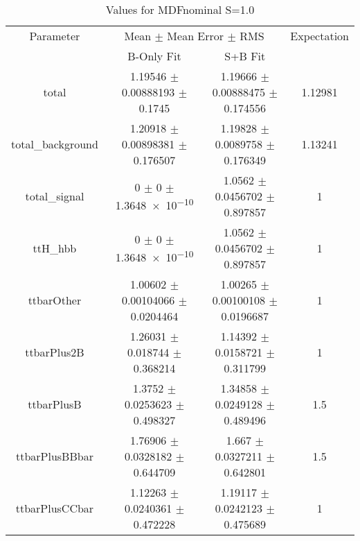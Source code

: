 \begin{table}
\centering
\caption{Values for MDFnominal S=1.0}
\begin{tabular}{cccc}
\toprule
Parameter & \multicolumn{2}{c}{Mean $\pm$ Mean Error $\pm$ RMS} & Expectation\\
 & B-Only Fit & S+B Fit & \\
\midrule
total & \num{1.19546} $\pm$ \num{0.00888193} $\pm$ \num{0.1745} & \num{1.19666} $\pm$ \num{0.00888475} $\pm$ \num{0.174556} & \num{1.12981}\\
total\_background & \num{1.20918} $\pm$ \num{0.00898381} $\pm$ \num{0.176507} & \num{1.19828} $\pm$ \num{0.0089758} $\pm$ \num{0.176349} & \num{1.13241}\\
total\_signal & \num{0} $\pm$ \num{0} $\pm$ \num{1.3648e-10} & \num{1.0562} $\pm$ \num{0.0456702} $\pm$ \num{0.897857} & \num{1}\\
ttH\_hbb & \num{0} $\pm$ \num{0} $\pm$ \num{1.3648e-10} & \num{1.0562} $\pm$ \num{0.0456702} $\pm$ \num{0.897857} & \num{1}\\
ttbarOther & \num{1.00602} $\pm$ \num{0.00104066} $\pm$ \num{0.0204464} & \num{1.00265} $\pm$ \num{0.00100108} $\pm$ \num{0.0196687} & \num{1}\\
ttbarPlus2B & \num{1.26031} $\pm$ \num{0.018744} $\pm$ \num{0.368214} & \num{1.14392} $\pm$ \num{0.0158721} $\pm$ \num{0.311799} & \num{1}\\
ttbarPlusB & \num{1.3752} $\pm$ \num{0.0253623} $\pm$ \num{0.498327} & \num{1.34858} $\pm$ \num{0.0249128} $\pm$ \num{0.489496} & \num{1.5}\\
ttbarPlusBBbar & \num{1.76906} $\pm$ \num{0.0328182} $\pm$ \num{0.644709} & \num{1.667} $\pm$ \num{0.0327211} $\pm$ \num{0.642801} & \num{1.5}\\
ttbarPlusCCbar & \num{1.12263} $\pm$ \num{0.0240361} $\pm$ \num{0.472228} & \num{1.19117} $\pm$ \num{0.0242123} $\pm$ \num{0.475689} & \num{1}\\
\bottomrule
\end{tabular}
\end{table}